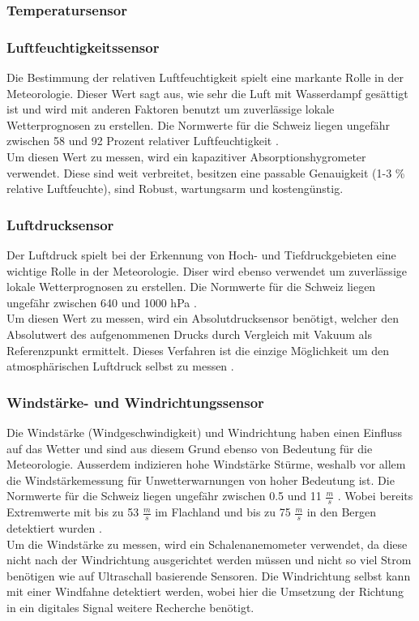 \subsubsection{Temperatursensor}


\subsubsection{Luftfeuchtigkeitssensor}
Die Bestimmung der relativen Luftfeuchtigkeit spielt eine markante Rolle in der Meteorologie. Dieser Wert sagt aus, wie sehr die Luft mit Wasserdampf gesättigt ist und wird mit anderen Faktoren benutzt um zuverlässige lokale Wetterprognosen zu erstellen. Die Normwerte für die Schweiz liegen ungefähr zwischen 58 und 92 Prozent relativer Luftfeuchtigkeit  \cite{MeteoSchweizFeuchte}.\\
Um diesen Wert zu messen, wird ein kapazitiver Absorptionshygrometer verwendet. Diese sind weit verbreitet, besitzen eine passable Genauigkeit (1-3 \% relative Luftfeuchte), sind Robust, wartungsarm und kostengünstig.

\subsubsection{Luftdrucksensor}
Der Luftdruck spielt bei der Erkennung von Hoch- und Tiefdruckgebieten eine wichtige Rolle in der Meteorologie. Diser wird ebenso verwendet um zuverlässige lokale Wetterprognosen zu erstellen. Die Normwerte für die Schweiz liegen ungefähr zwischen 640 und 1000 hPa \cite{MeteoSchweizDruck}.\\
Um diesen Wert zu messen, wird ein Absolutdrucksensor benötigt, welcher den Absolutwert des aufgenommenen Drucks durch Vergleich mit Vakuum als Referenzpunkt ermittelt. Dieses Verfahren ist die einzige Möglichkeit um den atmosphärischen Luftdruck selbst zu messen \cite{WikiDruck}. 

\subsubsection{Windstärke- und Windrichtungssensor}
Die Windstärke (Windgeschwindigkeit) und Windrichtung haben einen Einfluss auf das Wetter und sind aus diesem Grund ebenso von Bedeutung für die Meteorologie. Ausserdem indizieren hohe Windstärke Stürme, weshalb vor allem die Windstärkemessung für Unwetterwarnungen von hoher Bedeutung ist. Die Normwerte für die Schweiz liegen ungefähr zwischen 0.5 und 11 $\frac{m}{s}$ \cite{MeteoSchweizWindnorm}. Wobei bereits Extremwerte mit bis zu 53 $\frac{m}{s}$ im Flachland und bis zu 75 $\frac{m}{s}$ in den Bergen detektiert wurden \cite{MeteoSchweizExtrem}.\\
Um die Windstärke zu messen, wird ein Schalenanemometer verwendet, da diese nicht nach der Windrichtung ausgerichtet werden müssen und nicht so viel Strom benötigen wie auf Ultraschall basierende Sensoren. Die Windrichtung selbst kann mit einer Windfahne detektiert werden, wobei hier die Umsetzung der Richtung in ein digitales Signal weitere Recherche benötigt.

